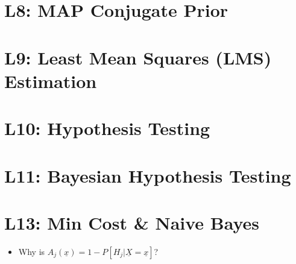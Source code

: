 \documentclass{article}
\begin{document}
\section{L8: MAP Conjugate Prior}
 
\newpage

\section{L9: Least Mean Squares (LMS) Estimation}
 
\newpage

\section{L10: Hypothesis Testing}
\begin{faq}

\end{faq}
\newpage

\section{L11: Bayesian Hypothesis Testing}
\begin{faq}

\end{faq}
\newpage

\section{L13: Min Cost \& Naive Bayes}
\begin{faq}
    \begin{itemize}
        \item Why is $A_j (\underline{x}) = 1 - P[H_j | \underline{X} = \underline{x}]$?
    \end{itemize}
\end{faq}
\newpage
\end{document}
